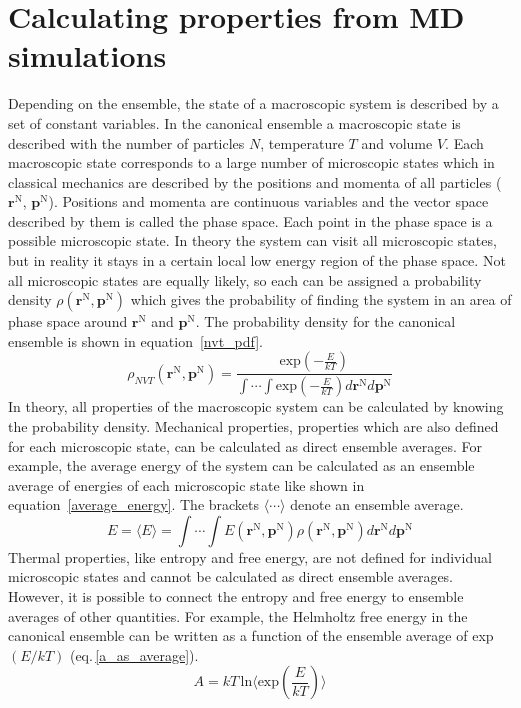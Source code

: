 \section{Calculating properties from MD simulations}
Depending on the ensemble, the state of a macroscopic system is described by a set of constant variables. In the canonical ensemble a macroscopic state is described with the number of particles $N$, temperature $T$ and volume $V$. Each macroscopic state corresponds to a large number of microscopic states which in classical mechanics are described by the positions and momenta of all particles ($\mathbf{r}^\text{N}$, $\mathbf{p}^\text{N}$). Positions and momenta are continuous variables and the vector space described by them is called the phase space. Each point in the phase space is a possible microscopic state. In theory the system can visit all microscopic states, but in reality it stays in a certain local low energy region of the phase space. Not all microscopic states are equally likely, so each can be assigned a probability density $\rho(\mathbf{r}^\text{N},\mathbf{p}^\text{N})$ which gives the probability of finding the system in an area of phase space around $\mathbf{r}^\text{N}$ and $\mathbf{p}^\text{N}$. The probability density for the canonical ensemble is shown in equation~\ref{nvt_pdf}.
\begin{equation} \label{nvt_pdf}
    \rho_{NVT}(\mathbf{r}^\text{N},\mathbf{p}^\text{N}) = \frac{\text{exp}\left(- \frac{E}{kT} \right)}{\int \cdots \int \text{exp}\left(- \frac{E}{kT} \right) d\mathbf{r}^\text{N} d\mathbf{p}^\text{N}}
\end{equation}
In theory, all properties of the macroscopic system can be calculated by knowing the probability density. Mechanical properties, properties which are also defined for each microscopic state, can be calculated as direct ensemble averages. For example, the average energy of the system can be calculated as an ensemble average of energies of each microscopic state like shown in equation~\ref{average_energy}. The brackets $\langle \cdots \rangle$ denote an ensemble average.
\begin{equation} \label{average_energy}
    E = \langle E \rangle = \int \cdots \int  E(\mathbf{r}^\text{N},\mathbf{p}^\text{N}) \rho(\mathbf{r}^\text{N},\mathbf{p}^\text{N}) d\mathbf{r}^\text{N} d\mathbf{p}^\text{N} 
\end{equation}
Thermal properties, like entropy and free energy, are not defined for individual microscopic states and cannot be calculated as direct ensemble averages. However, it is possible to connect the entropy and free energy to ensemble averages of other quantities. For example, the Helmholtz free energy in the canonical ensemble can be written as a function of the ensemble average of exp$(E/kT)$ (eq.\,\ref{a_as_average}).
\begin{equation} \label{a_as_average}
    A = k T \, \text{ln} \biggl \langle \text{exp} \left( \frac{E}{kT} \right)   \biggr \rangle 
\end{equation}

